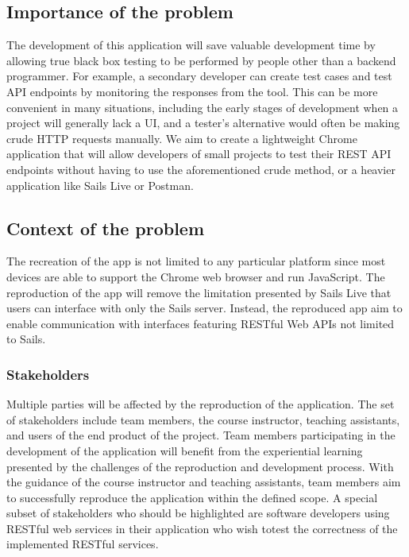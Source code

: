 \documentclass{article}
\begin{document}
\subsection{Importance​ ​of​ ​the​ ​problem }

The development of this application will save valuable development time by allowing true black box testing to be performed by people other than a backend programmer. For example, a secondary developer can create test cases and test API endpoints by monitoring the responses from the tool. This can be more convenient in many situations, including the early stages of development when a project will generally lack a UI, and a tester’s alternative would often be making crude HTTP requests manually. We aim to create a lightweight Chrome application that will allow developers of small projects to test their REST API endpoints without having to use the​ ​aforementioned​ ​crude​ ​method,​ ​or​ ​a​ ​heavier​ ​application​ ​like​ ​Sails​ ​Live​ ​or​ ​Postman. 

\newpage
\subsection{ Context​ ​of​ ​the​ ​problem }
The recreation of the app is not limited to any particular platform since most devices are able to support the Chrome web browser and run JavaScript. The reproduction of the app will remove the limitation presented by Sails Live that users can interface with only the Sails server. Instead, the reproduced app aim to enable communication with interfaces featuring RESTful Web APIs not​ ​limited​ ​to​ ​Sails. 

\subsubsection{ Stakeholders }
Multiple parties will be affected by the reproduction of the application. The set of stakeholders               include team members, the course instructor, teaching assistants, and users of the end product              of the project. Team members participating in the development of the application will benefit              from the experiential learning presented by the challenges of the reproduction and development             process. With the guidance of the course instructor and teaching assistants, team members aim              to successfully reproduce the application within the defined scope. A special subset of             stakeholders who should be highlighted are software developers using RESTful web services in             their​ ​application​ ​who​ ​wish​ ​to​ ​test​ ​the​ ​correctness​ ​of​ ​the​ ​implemented​ ​RESTful​ ​services. 
\end{document}
